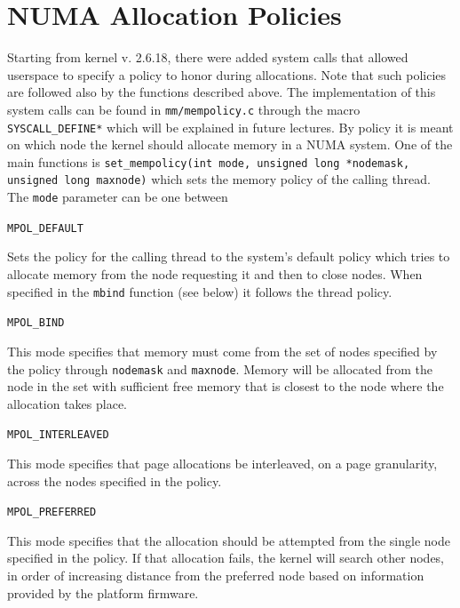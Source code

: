 \documentclass[twoside]{article}
\begin{document}
\section{NUMA Allocation Policies}
\label{sec:NUMA Allocation Policies}

Starting from kernel v. 2.6.18, there were added system calls that allowed userspace
to specify a policy to honor during allocations. Note that such policies are
followed also by the functions described above. The implementation of this
system calls can be found in \texttt{mm/mempolicy.c} through the macro
\texttt{SYSCALL_DEFINE*} which will be explained in future lectures.
By policy it is meant on which
node the kernel should allocate memory in a NUMA system.
One of the main functions is
\texttt{set_mempolicy(int mode, unsigned long *nodemask, unsigned long maxnode)}
which sets the memory policy of the calling thread. The \texttt{mode} parameter
can be one between

\begin{description}
    \item \texttt{MPOL_DEFAULT}

        Sets the policy for the calling thread to the system's default policy
        which tries to allocate memory from the node requesting it and then to
        close nodes. When specified in the \texttt{mbind} function (see below)
        it follows the thread policy.

    \item \texttt{MPOL_BIND}

        This mode specifies that memory must come from the
        set of nodes specified by the policy through \texttt{nodemask} and 
        \texttt{maxnode}.  Memory will be allocated from
        the node in the set with sufficient free memory that is closest to
        the node where the allocation takes place.

    \item \texttt{MPOL_INTERLEAVED}

        This mode specifies that page allocations be
        interleaved, on a page granularity, across the nodes specified in
        the policy.

    \item \texttt{MPOL_PREFERRED}

        This mode specifies that the allocation should be
        attempted from the single node specified in the policy.  If that
        allocation fails, the kernel will search other nodes, in order of
        increasing distance from the preferred node based on information
        provided by the platform firmware.
\end{description}
\end{document}
